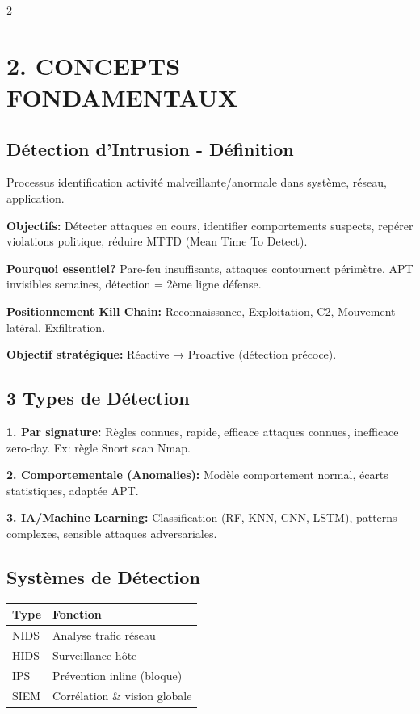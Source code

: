 \documentclass[9pt,a4paper]{extarticle}
\begin{document}
\begin{multicols}{2}
\section*{2. CONCEPTS FONDAMENTAUX}

\subsection*{Détection d'Intrusion - Définition}
Processus identification activité malveillante/anormale dans système, réseau, application.

\textbf{Objectifs:} Détecter attaques en cours, identifier comportements suspects, repérer violations politique, réduire MTTD (Mean Time To Detect).

\textbf{Pourquoi essentiel?} Pare-feu insuffisants, attaques contournent périmètre, APT invisibles semaines, détection = 2ème ligne défense.

\textbf{Positionnement Kill Chain:} Reconnaissance, Exploitation, C2, Mouvement latéral, Exfiltration.

\textbf{Objectif stratégique:} Réactive → Proactive (détection précoce).

\subsection*{3 Types de Détection}
\textbf{1. Par signature:} Règles connues, rapide, efficace attaques connues, inefficace zero-day. Ex: règle Snort scan Nmap.

\textbf{2. Comportementale (Anomalies):} Modèle comportement normal, écarts statistiques, adaptée APT.

\textbf{3. IA/Machine Learning:} Classification (RF, KNN, CNN, LSTM), patterns complexes, sensible attaques adversariales.

\subsection*{Systèmes de Détection}
\begin{tabular}{|l|l|}
\hline
\rowcolor{gray!20}\textbf{Type} & \textbf{Fonction} \\
\hline
NIDS & Analyse trafic réseau \\
\hline
HIDS & Surveillance hôte \\
\hline
IPS & Prévention inline (bloque) \\
\hline
SIEM & Corrélation \& vision globale \\
\hline
\end{tabular}


\end{multicols}
\end{document}
